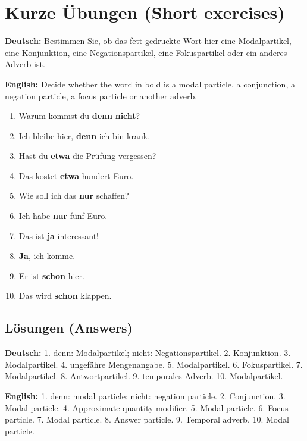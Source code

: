 \documentclass[a4paper,11pt]{article}
\newcommand{\GermanText}[1]{\textbf{Deutsch: }#1\par}
\newcommand{\EnglishText}[1]{{\small\color{SoftGray}\textbf{English: }#1\par}}
\begin{document}
\section{Kurze Übungen \textnormal{(Short exercises)}}
\GermanText{Bestimmen Sie, ob das fett gedruckte Wort hier eine Modalpartikel, eine Konjunktion, eine Negationspartikel, eine Fokuspartikel oder ein anderes Adverb ist.}
\EnglishText{Decide whether the word in bold is a modal particle, a conjunction, a negation particle, a focus particle or another adverb.}
\begin{exbox}\begin{enumerate}
\item Warum kommst du \textbf{denn} \textbf{nicht}?
\item Ich bleibe hier, \textbf{denn} ich bin krank.
\item Hast du \textbf{etwa} die Prüfung vergessen?
\item Das kostet \textbf{etwa} hundert Euro.
\item Wie soll ich das \textbf{nur} schaffen?
\item Ich habe \textbf{nur} fünf Euro.
\item Das ist \textbf{ja} interessant!
\item \textbf{Ja}, ich komme.
\item Er ist \textbf{schon} hier.
\item Das wird \textbf{schon} klappen.
\end{enumerate}\end{exbox}
\subsection{Lösungen \textnormal{(Answers)}}
\GermanText{1. denn: Modalpartikel; nicht: Negationspartikel. 2. Konjunktion. 3. Modalpartikel. 4. ungefähre Mengenangabe. 5. Modalpartikel. 6. Fokuspartikel. 7. Modalpartikel. 8. Antwortpartikel. 9. temporales Adverb. 10. Modalpartikel.}
\EnglishText{1. denn: modal particle; nicht: negation particle. 2. Conjunction. 3. Modal particle. 4. Approximate quantity modifier. 5. Modal particle. 6. Focus particle. 7. Modal particle. 8. Answer particle. 9. Temporal adverb. 10. Modal particle.}
\end{document}
